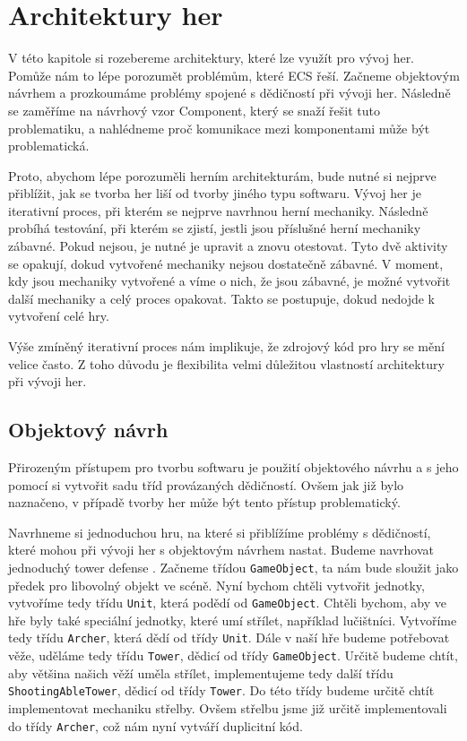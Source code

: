 \chapter{Architektury her}
V této kapitole si rozebereme architektury, které lze využít pro vývoj her. Pomůže nám to lépe porozumět problémům, které ECS řeší. Začneme objektovým návrhem a prozkoumáme problémy spojené s dědičností při vývoji her. Následně se zaměříme na návrhový vzor Component, který se snaží řešit tuto problematiku, a nahlédneme proč komunikace mezi komponentami může být problematická.

Proto, abychom lépe porozuměli herním architekturám, bude nutné si nejprve přiblížit, jak se tvorba her liší od tvorby jiného typu softwaru. Vývoj her je iterativní proces, při kterém se nejprve navrhnou herní mechaniky. Následně probíhá testování, při kterém se zjistí, jestli jsou příslušné herní mechaniky zábavné. Pokud nejsou, je nutné je upravit a znovu otestovat. Tyto dvě aktivity se opakují, dokud vytvořené mechaniky nejsou dostatečně zábavné. V moment, kdy jsou mechaniky vytvořené a víme o nich, že jsou zábavné, je možné vytvořit další mechaniky a celý proces opakovat. Takto se postupuje, dokud nedojde k vytvoření celé hry.

Výše zmíněný iterativní proces nám implikuje, že zdrojový kód pro hry se mění velice často. Z toho důvodu je flexibilita velmi důležitou vlastností architektury při vývoji her.

\section{Objektový návrh}
Přirozeným přístupem pro tvorbu softwaru je použití objektového návrhu a s jeho pomocí si vytvořit sadu tříd provázaných dědičností. Ovšem jak již bylo naznačeno, v případě tvorby her může být tento přístup problematický.


Navrhneme si jednoduchou hru, na které si přiblížíme problémy s dědičností, které mohou při vývoji her s objektovým návrhem nastat. Budeme navrhovat jednoduchý tower defense . Začneme třídou \verb|GameObject|, ta nám bude sloužit jako předek pro libovolný objekt ve scéně. Nyní bychom chtěli vytvořit jednotky, vytvoříme tedy třídu \verb|Unit|, která podědí od \verb|GameObject|. Chtěli bychom, aby ve hře byly také speciální jednotky, které umí střílet, například lučištníci. Vytvoříme tedy třídu \verb|Archer|, která dědí od třídy \verb|Unit|. Dále v naší hře budeme potřebovat věže, uděláme tedy třídu \verb|Tower|, dědicí od třídy \verb|GameObject|. Určitě budeme chtít, aby většina našich věží uměla střílet, implementujeme tedy další třídu \verb|ShootingAbleTower|, dědicí od třídy \verb|Tower|. Do této třídy budeme určitě chtít implementovat mechaniku střelby. Ovšem střelbu jsme již určitě implementovali do třídy \verb|Archer|, což nám nyní vytváří duplicitní kód.


